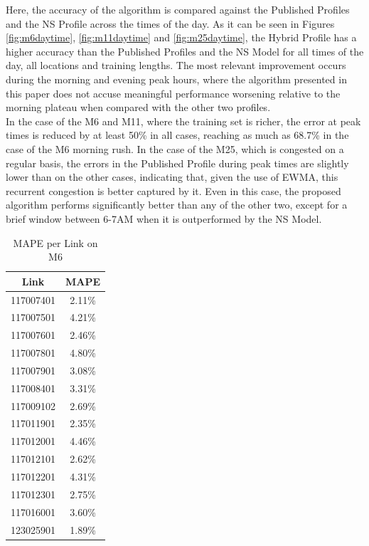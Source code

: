 \documentclass[conference, letterpaper]{IEEEtran}
\begin{document}
Here, the accuracy of the algorithm is compared against the Published Profiles and the NS Profile across the times of the day.
As it can be seen in Figures \ref{fig:m6daytime}, \ref{fig:m11daytime} and \ref{fig:m25daytime}, the Hybrid Profile has a higher accuracy than the Published Profiles and the NS Model for all times of the day, all locations and training lengths. 
The most relevant improvement occurs during the morning and evening peak hours, where the algorithm presented in this paper does not accuse meaningful performance worsening relative to the morning plateau when compared with the other two profiles.\\
In the case of the M6 and M11, where the training set is richer, the error at peak times is reduced by at least 50\% in all cases, reaching as much as 68.7\% in the case of the M6 morning rush.
In the case of the M25, which is congested on a regular basis, the errors in the Published Profile during peak times are slightly lower than on the other cases, indicating that, given the use of EWMA, this recurrent congestion is better captured by it. 
Even in this case, the proposed algorithm performs significantly better than any of the other two, except for a brief window between 6-7AM when it is outperformed by the NS Model.

\begin{table}[htbp]
	\caption{MAPE per Link on M6}
	\begin{center}
		\begin{tabular}{|c|c|}
			\hline
			\textbf{Link}&{\textbf{MAPE}} \\
			\hline
			117007401& 2.11\%\\
			\hline
			117007501& 4.21\%\\
			\hline
			117007601& 2.46\%\\
			\hline
			117007801& 4.80\%\\
			\hline
			117007901& 3.08\%\\
			\hline
			117008401& 3.31\%\\
			\hline
			117009102& 2.69\%\\
			\hline
			117011901& 2.35\%\\
			\hline
			117012001& 4.46\%\\
			\hline
			117012101& 2.62\%\\
			\hline
			117012201& 4.31\%\\
			\hline
			117012301& 2.75\%\\
			\hline
			117016001& 3.60\%\\
			\hline
			123025901& 1.89\%\\
			\hline
		\end{tabular}
		\label{tab1}
	\end{center}
	\label{table:m6mape}
\end{table}
\end{document}

